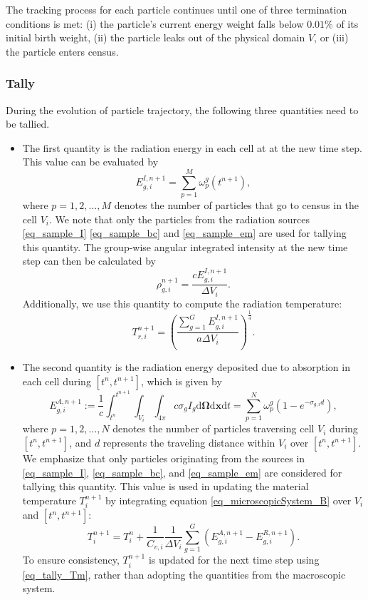 \documentclass[preprint,12pt]{elsarticle}
\theoremstyle{definition}
\theoremstyle{plain}
\numberwithin{equation}{section}
\numberwithin{algorithm}{section}
\newcounter{eq_count}
\newcommand{\vOmega}{\mathbf{\Omega}}
\newcommand{\vx}{\mathbf{x}}
\newcommand{\dd}{{\text{d}}}
\begin{document}
The tracking process for each particle continues until one of three termination conditions is met: (i)  the particle's current energy weight falls below  $ 0.01\% $  of its initial birth weight, (ii) the particle leaks out of the physical domain $V$, or (iii) the particle enters census.

\subsubsection{Tally}
During the evolution of particle trajectory, the following three quantities need to be tallied. 
\begin{itemize}
    \item The first quantity is the radiation energy in each cell at at the new time step. This value can be evaluated by
\begin{equation} \label{eq_def_EI}
    E_{g,i}^{I,n+1}  = \sum_{p=1}^M \omega_p^g(t^{n+1}),
\end{equation}
where $p= 1,2,\ldots,M$ denotes the number of particles that go to census in the cell $V_i$. We note that only the particles from the radiation sources \eqref{eq_sample_I} \eqref{eq_sample_bc} and \eqref{eq_sample_em} are used for tallying this quantity. The group-wise angular integrated intensity at the new time step can then be calculated by
\begin{equation}\label{eq_tally_Tr2}
	\rho_{g,i}^{n+1} = \frac{c E_{g,i}^{I,n+1} }{\Delta V_i} .
\end{equation}
Additionally, we use this quantity to compute the radiation temperature:
\begin{equation}\label{eq_tally_Tr}
	T_{r,i}^{n+1} = \left( \frac{\sum_{g=1}^G E_{g,i}^{I,n+1} }{a \Delta V_i}\right )^{\frac{1}{4}}.
\end{equation}
\item The second quantity is the radiation energy deposited due to absorption in each cell during $[t^n,t^{n+1}]$, which is given by
\begin{equation}\label{eq_def_EA}
    E_{g,i}^{A,n+1} := \frac{1}{c} \int_{t^n}^{t^{n+1}}  \int_{V_i} \int_{4 \pi} c \sigma_g I_g \dd{\vOmega} \dd{\vx} \dd{t} =  \sum_{p=1}^N \omega_p^{g} (1 - e^{-\sigma_{g,i} d} ),
\end{equation}
where $p= 1,2,\ldots,N$ denotes the number of particles traversing cell $V_i$ during  $[t^n,t^{n+1}]$, and $d$ represents the traveling distance within $V_i$ over $[t^n,t^{n+1}]$. We emphasize that only particles originating from the sources in \eqref{eq_sample_I}, \eqref{eq_sample_bc}, and \eqref{eq_sample_em} are considered for tallying this quantity. This value is used in updating the material temperature $T_i^{n+1}$ by integrating equation \eqref{eq_microscopicSystem_B} over $V_i$ and $[t^n,t^{n+1}]$:
\begin{equation} \label{eq_tally_Tm}
    T_i^{n+1} = T_i^n + \frac{1}{C_{v,i}} \frac{1}{ \Delta V_i}    \sum_{g=1}^G \left  (E_{g,i}^{A,n+1} -  E_{g,i}^{R,n+1} \right).
\end{equation}
To ensure consistency, $T_i^{n+1}$ is updated for the next time step using \eqref{eq_tally_Tm}, rather than adopting the quantities from the macroscopic system.


\end{itemize}
\end{document}
